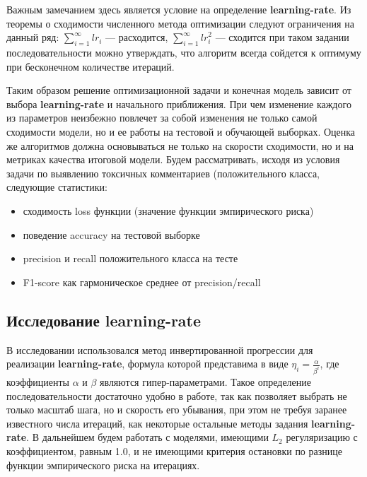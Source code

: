 \documentclass{article}
\begin{document}
    \begin{leftrule}
        Важным замечанием здесь является условие на определение \textbf{learning-rate}. Из теоремы о сходимости численного метода оптимизации следуют ограничения на данный ряд: $\sum_{i=1}^{\infty}{{lr}_i}$ — расходится, $\sum_{i=1}^{\infty}{{lr}_i^2}$ — сходится
        \noindent при таком задании последовательности можно утверждать, что алгоритм всегда сойдется к оптимуму при бесконечном количестве итераций.
    \end{leftrule}
    
    Таким образом решение оптимизационной задачи и конечная модель зависит от выбора \textbf{learning-rate} и начального приближения. При чем изменение каждого из параметров неизбежно повлечет за собой изменения не только самой сходимости модели, но и ее работы на тестовой и обучающей выборках. Оценка же алгоритмов должна основываться не только на скорости сходимости, но и на метриках качества итоговой модели. Будем рассматривать, исходя из условия задачи по выявлению токсичных комментариев (положительного класса, следующие статистики:

    \begin{itemize}
        \item сходимость loss функции (значение функции эмпирического риска)
        \item поведение accuracy на тестовой выборке
        \item precision и recall положительного класса на тесте
        \item F1-score как гармоническое среднее от precision/recall
    \end{itemize}

    \subsection{Исследование learning-rate}

        В исследовании использовался метод инвертированной прогрессии для реализации \textbf{learning-rate}, формула которой представима в виде $\eta_i=\frac{\alpha}{\beta^i}$, где коэффициенты $\alpha$ и $\beta$ являются гипер-параметрами. Такое определение последовательности достаточно удобно в работе, так как позволяет выбрать не только масштаб шага, но и скорость его убывания, при этом не требуя заранее известного числа итераций, как некоторые остальные методы задания \textbf{learning-rate}. В дальнейшем будем работать с моделями, имеющими $L_2$ регуляризацию с коэффициентом, равным 1.0, и не имеющими критерия остановки по разнице функции эмпирического риска на итерациях.
\end{document}
